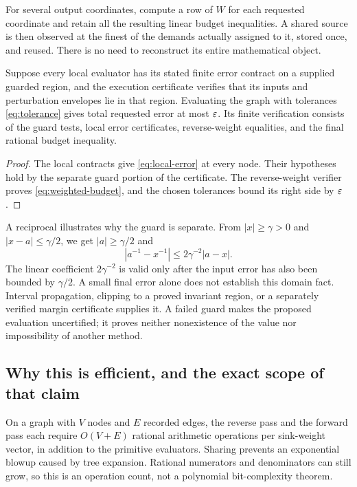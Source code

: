 For several output coordinates, compute a row of $W$ for each requested coordinate and retain all the resulting linear budget inequalities. A shared source is then observed at the finest of the demands actually assigned to it, stored once, and reused. There is no need to reconstruct its entire mathematical object.

\begin{proposition}\label{prop:guarded-graph}
Suppose every local evaluator has its stated finite error contract on a supplied guarded region, and the execution certificate verifies that its inputs and perturbation envelopes lie in that region. Evaluating the graph with tolerances \eqref{eq:tolerance} gives total requested error at most $\varepsilon$. Its finite verification consists of the guard tests, local error certificates, reverse-weight equalities, and the final rational budget inequality.
\end{proposition}
\begin{proof}
The local contracts give \eqref{eq:local-error} at every node. Their hypotheses hold by the separate guard portion of the certificate. The reverse-weight verifier proves \eqref{eq:weighted-budget}, and the chosen tolerances bound its right side by $\varepsilon$.
\end{proof}

A reciprocal illustrates why the guard is separate. From $|x|\ge\gamma>0$ and $|x-a|\le\gamma/2$, we get $|a|\ge\gamma/2$ and
\[
 |a^{-1}-x^{-1}|\le 2\gamma^{-2}|a-x|.
\]
The linear coefficient $2\gamma^{-2}$ is valid only after the input error has also been bounded by $\gamma/2$. A small final error alone does not establish this domain fact. Interval propagation, clipping to a proved invariant region, or a separately verified margin certificate supplies it. A failed guard makes the proposed evaluation uncertified; it proves neither nonexistence of the value nor impossibility of another method.

\subsection{Why this is efficient, and the exact scope of that claim}

On a graph with $V$ nodes and $E$ recorded edges, the reverse pass and the forward pass each require $O(V+E)$ rational arithmetic operations per sink-weight vector, in addition to the primitive evaluators. Sharing prevents an exponential blowup caused by tree expansion. Rational numerators and denominators can still grow, so this is an operation count, not a polynomial bit-complexity theorem.

